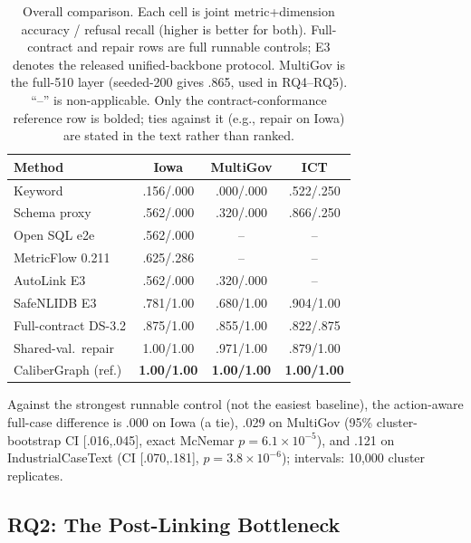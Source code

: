 \documentclass[letterpaper]{article}
\begin{document}
\begin{table}[t]
\centering
\small
\setlength{\tabcolsep}{2.5pt}
\begin{tabular}{lccc}
\toprule
Method & Iowa & MultiGov & ICT \\
\midrule
Keyword & .156/.000 & .000/.000 & .522/.250 \\
Schema proxy & .562/.000 & .320/.000 & .866/.250 \\
Open SQL e2e & .562/.000 & -- & -- \\
MetricFlow 0.211 & .625/.286 & -- & -- \\
AutoLink E3 & .562/.000 & .320/.000 & -- \\
SafeNLIDB E3 & .781/1.00 & .680/1.00 & .904/1.00 \\
Full-contract DS-3.2 & .875/1.00 & .855/1.00 & .822/.875 \\
Shared-val.\ repair & 1.00/1.00 & .971/1.00 & .879/1.00 \\
CaliberGraph (ref.) & \textbf{1.00/1.00} & \textbf{1.00/1.00} & \textbf{1.00/1.00} \\
\bottomrule
\end{tabular}
\caption{Overall comparison. Each cell is joint metric+dimension accuracy / refusal recall (higher is better for both). Full-contract and repair rows are full runnable controls; E3 denotes the released unified-backbone protocol. MultiGov is the full-510 layer (seeded-200 gives .865, used in RQ4--RQ5). ``--'' is non-applicable. Only the contract-conformance reference row is bolded; ties against it (e.g., repair on Iowa) are stated in the text rather than ranked.}
\label{tab:overall}
\end{table}

Against the strongest runnable control (not the easiest baseline), the action-aware full-case difference is .000 on Iowa (a tie), .029 on MultiGov (95\% cluster-bootstrap CI [.016,.045], exact McNemar $p{=}6.1{\times}10^{-5}$), and .121 on IndustrialCaseText (CI [.070,.181], $p{=}3.8{\times}10^{-6}$); intervals: 10{,}000 cluster replicates.

\subsection{RQ2: The Post-Linking Bottleneck}
\end{document}
